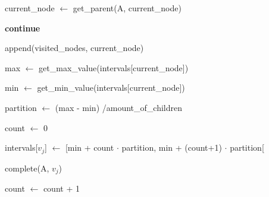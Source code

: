 \begin{algorithm}
\begin{algorithmic}
\Else

\State current\_node $\gets$ get\_parent(A, current\_node)

\State \textbf{continue}

\EndIf

\EndIf


\State append(visited\_nodes, current\_node)

\State max $\gets$ get\_max\_value(intervals[current\_node])

\State min $\gets$ get\_min\_value(intervals[current\_node]) 

\State partition $\gets$ (max - min) \slash amount\_of\_children

\State count $\gets$ 0


\State intervals[$v_{j}$] $\gets$ [min + count $\cdot$  partition, min + (count+1) $\cdot$  partition[

\State complete(A, $v_{j}$)

\State count $\gets$ count + 1

\EndFor

\EndIf


\end{algorithmic}
\end{algorithm}

